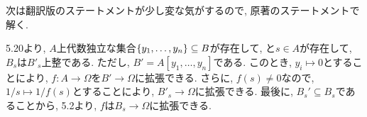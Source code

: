 \documentclass[dvipdfmx]{jsarticle}
\begin{document}
    \color{red}
    次は翻訳版のステートメントが少し変な気がするので, 原著のステートメントで解く.
    \color{black}

    \begin{problem}
        5.20より, $A$上代数独立な集合$\{y_1, \dots, y_n\} \subseteq B$が存在して,
        と$s \in A$が存在して, $B_s$は$B'_s$上整である.
        ただし, $B' = A[y_1, \dots, y_n]$である.
        このとき, $y_i \mapsto 0$とすることにより, $f: A\to \Omega$を$B' \to \Omega$に拡張できる.
        さらに, $f(s) \neq 0$なので, $1/s \mapsto 1/f(s)$とすることにより, $B'_s \to \Omega$に拡張できる.
        最後に, $B_s' \subseteq B_s$であることから,
        5.2より, $f$は$B_s \to \Omega$に拡張できる.
    \end{problem}
\end{document}
